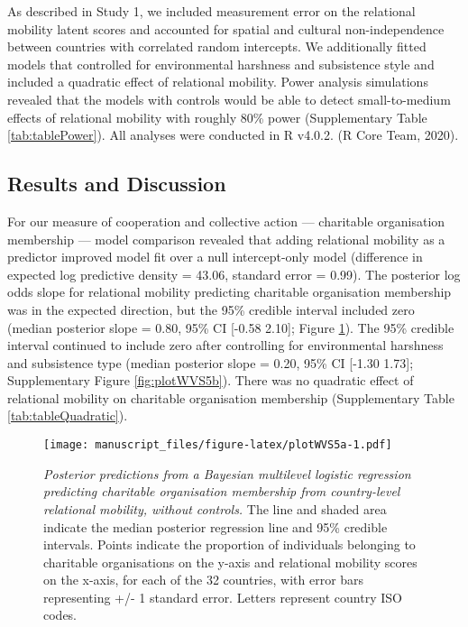 \documentclass[
  man,floatsintext]{apa6}
\begin{document}
As described in Study 1, we included measurement error on the relational mobility latent scores and accounted for spatial and cultural non-independence between countries with correlated random intercepts. We additionally fitted models that controlled for environmental harshness and subsistence style and included a quadratic effect of relational mobility. Power analysis simulations revealed that the models with controls would be able to detect small-to-medium effects of relational mobility with roughly 80\% power (Supplementary Table \ref{tab:tablePower}). All analyses were conducted in R v4.0.2. (R Core Team, 2020).

\hypertarget{results-and-discussion-1}{%
\subsection{Results and Discussion}\label{results-and-discussion-1}}

For our measure of cooperation and collective action --- charitable organisation membership --- model comparison revealed that adding relational mobility as a predictor improved model fit over a null intercept-only model (difference in expected log predictive density = 43.06, standard error = 0.99). The posterior log odds slope for relational mobility predicting charitable organisation membership was in the expected direction, but the 95\% credible interval included zero (median posterior slope = 0.80, 95\% CI {[}-0.58 2.10{]}; Figure \ref{fig:plotWVS5a}). The 95\% credible interval continued to include zero after controlling for environmental harshness and subsistence type (median posterior slope = 0.20, 95\% CI {[}-1.30 1.73{]}; Supplementary Figure \ref{fig:plotWVS5b}). There was no quadratic effect of relational mobility on charitable organisation membership (Supplementary Table \ref{tab:tableQuadratic}).



\begin{figure}
\centering
\texttt{[image: manuscript\_files/figure-latex/plotWVS5a-1.pdf]}
\caption{\label{fig:plotWVS5a}\emph{Posterior predictions from a Bayesian multilevel logistic regression predicting charitable organisation membership from country-level relational mobility, without controls.} The line and shaded area indicate the median posterior regression line and 95\% credible intervals. Points indicate the proportion of individuals belonging to charitable organisations on the y-axis and relational mobility scores on the x-axis, for each of the 32 countries, with error bars representing +/- 1 standard error. Letters represent country ISO codes.}
\end{figure}
\end{document}
